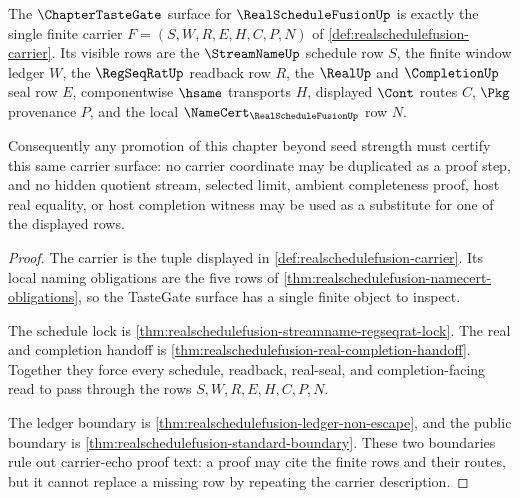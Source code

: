 \begin{theorem}
\label{thm:realschedulefusion-tastegate-obligation-surface}
The $\ChapterTasteGate$ surface for $\RealScheduleFusionUp$ is exactly the single finite carrier $F=(S,W,R,E,H,C,P,N)$ of \autoref{def:realschedulefusion-carrier}. Its visible rows are the $\StreamNameUp$ schedule row $S$, the finite window ledger $W$, the $\RegSeqRatUp$ readback row $R$, the $\RealUp$ and $\CompletionUp$ seal row $E$, componentwise $\hsame$ transports $H$, displayed $\Cont$ routes $C$, $\Pkg$ provenance $P$, and the local $\NameCert_{\RealScheduleFusionUp}$ row $N$.

Consequently any promotion of this chapter beyond seed strength must certify this same carrier surface: no carrier coordinate may be duplicated as a proof step, and no hidden quotient stream, selected limit, ambient completeness proof, host real equality, or host completion witness may be used as a substitute for one of the displayed rows.
\end{theorem}
\begin{proof}
The carrier is the tuple displayed in \autoref{def:realschedulefusion-carrier}. Its local naming obligations are the five rows of \autoref{thm:realschedulefusion-namecert-obligations}, so the TasteGate surface has a single finite object to inspect.

The schedule lock is \autoref{thm:realschedulefusion-streamname-regseqrat-lock}. The real and completion handoff is \autoref{thm:realschedulefusion-real-completion-handoff}. Together they force every schedule, readback, real-seal, and completion-facing read to pass through the rows $S,W,R,E,H,C,P,N$.

The ledger boundary is \autoref{thm:realschedulefusion-ledger-non-escape}, and the public boundary is \autoref{thm:realschedulefusion-standard-boundary}. These two boundaries rule out carrier-echo proof text: a proof may cite the finite rows and their routes, but it cannot replace a missing row by repeating the carrier description.
\end{proof}

